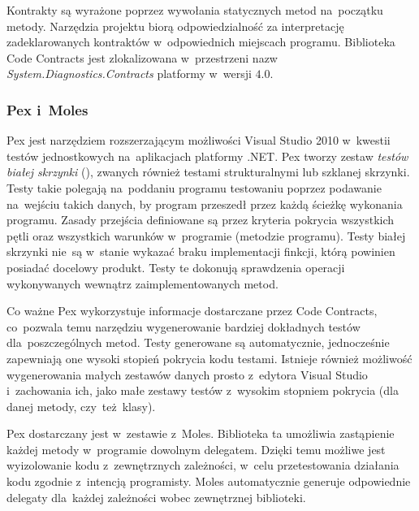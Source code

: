 Kontrakty są wyrażone poprzez wywołania statycznych metod na~początku metody. Narzędzia projektu biorą odpowiedzialność za interpretację zadeklarowanych kontraktów w~odpowiednich miejscach programu. Biblioteka Code Contracts jest zlokalizowana w~przestrzeni nazw \emph{System.Diagnostics.Contracts} platformy w~wersji $4.0$.

\subsubsection{Pex i~Moles\label{04:pex}}
Pex jest narzędziem rozszerzającym możliwości Visual Studio 2010 w~kwestii testów jednostkowych na~aplikacjach platformy .NET. Pex tworzy zestaw \emph{testów białej skrzynki} (), zwanych również testami strukturalnymi lub szklanej skrzynki. Testy takie polegają na~poddaniu programu testowaniu poprzez podawanie na~wejściu takich danych, by program przeszedł przez każdą ścieżkę wykonania programu. Zasady przejścia definiowane są przez kryteria pokrycia wszystkich pętli oraz wszystkich warunków w~programie (metodzie programu). Testy białej skrzynki nie~są w~stanie wykazać braku implementacji finkcji, którą powinien posiadać docelowy produkt. Testy te dokonują sprawdzenia operacji wykonywanych wewnątrz zaimplementowanych metod. 

Co ważne Pex wykorzystuje informacje dostarczane przez Code Contracts, co~pozwala temu narzędziu wygenerowanie bardziej dokładnych testów dla~poszczególnych metod. Testy generowane są automatycznie, jednocześnie zapewniają one wysoki stopień pokrycia kodu testami. Istnieje również możliwość wygenerowania małych zestawów danych prosto z~edytora Visual Studio i~zachowania ich, jako małe zestawy testów z~wysokim stopniem pokrycia (dla danej metody, czy~też~klasy).

Pex dostarczany jest w~zestawie z~Moles. Biblioteka ta umożliwia zastąpienie każdej metody w~programie dowolnym delegatem. Dzięki temu możliwe jest wyizolowanie kodu z~zewnętrznych zależności, w~celu przetestowania działania kodu zgodnie z~intencją programisty. Moles automatycznie generuje odpowiednie delegaty dla~każdej zależności wobec zewnętrznej biblioteki.